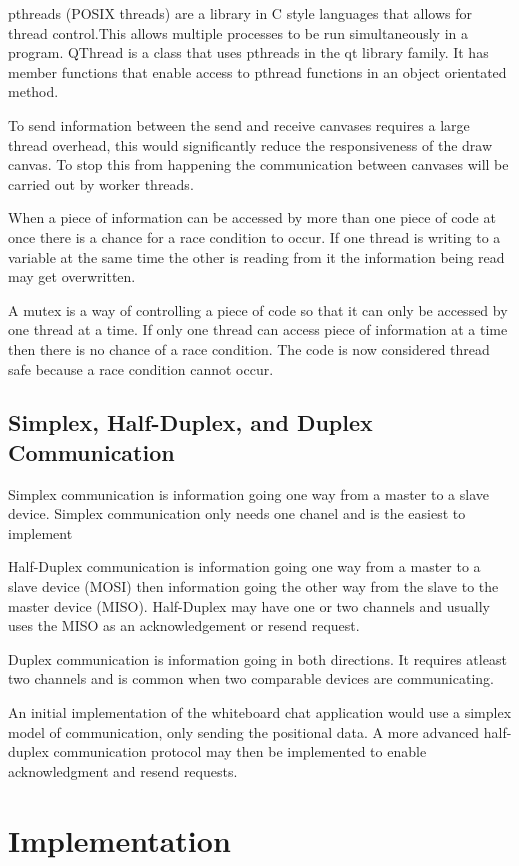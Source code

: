 \documentclass[10pt]{article}
\begin{document}
\begin{multicols*}{2}
pthreads (POSIX threads) are a library in C style languages that allows for thread control.This allows multiple processes to be run simultaneously in a program. QThread is a class that uses pthreads in the qt library family. It has member functions that enable access to pthread functions in an object orientated method. 

To send information between the send and receive canvases requires a large thread overhead, this would significantly reduce the responsiveness of the draw canvas. To stop this from happening the communication between canvases will be carried out by worker threads.

When a piece of information can be accessed by more than one piece of code at once there is a chance for a race condition to occur. If one thread is writing to a variable at the same time the other is reading from it the information being read may get overwritten.

A mutex is a way of controlling a piece of code so that it can only be accessed by one thread at a time. If only one thread can access piece of information at a time then there is no chance of a race condition. The code is now considered thread safe because a race condition cannot occur.

\subsection{Simplex, Half-Duplex, and Duplex Communication}
Simplex communication is information going one way from a master to a slave device. Simplex communication only needs one chanel and is the easiest to implement

Half-Duplex communication is information going one way from a master to a slave device (MOSI) then information going the other way from the slave to the master device (MISO). Half-Duplex may have one or two channels and usually uses the MISO as an acknowledgement or resend request.

Duplex communication  is information going in both directions. It requires atleast two channels and is common when two comparable devices are communicating.

An initial implementation of the whiteboard chat application would use a simplex model of communication, only sending the positional data. A more advanced half-duplex communication protocol may then be implemented to enable acknowledgment and resend requests.

\section{Implementation}

\end{multicols*}
\end{document}
